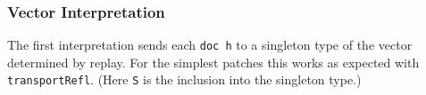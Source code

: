 \subsubsection{Vector Interpretation}

The first interpretation sends each \texttt{doc h} to a singleton type of the vector determined
by replay. For the simplest patches this works as expected with \texttt{transportRefl}.
(Here \texttt{S} is the inclusion into the singleton type.)
\begin{code}%
%
\>[2]\AgdaFunction{\AgdaUnderscore{}}\AgdaSpace{}%
\AgdaSymbol{:}\AgdaSpace{}%
\AgdaSpace{}%
\AgdaSpace{}%
\AgdaSymbol{(}\AgdaSpace{}%
\AgdaInductiveConstructor{[]}\AgdaSymbol{)}\AgdaSpace{}%
\AgdaSpace{}%
\AgdaSpace{}%
\AgdaSymbol{(}\AgdaSpace{}%
\AgdaSpace{}%
\AgdaInductiveConstructor{[]}\AgdaSymbol{)}\<%
\\
%
\>[2]\AgdaSymbol{\AgdaUnderscore{}}\AgdaSpace{}%
\AgdaSymbol{=}\AgdaSpace{}%
\AgdaSpace{}%
\AgdaSymbol{\AgdaUnderscore{}}\<%
\\
%
\\[\AgdaEmptyExtraSkip]%
%
\>[2]\AgdaFunction{\AgdaUnderscore{}}\AgdaSpace{}%
\AgdaSymbol{:}\AgdaSpace{}%
\AgdaSpace{}%
\AgdaSpace{}%
\AgdaSymbol{(}\AgdaSpace{}%
\AgdaSymbol{(}\AgdaSpace{}%
\AgdaSpace{}%
\AgdaInductiveConstructor{[]}\AgdaSymbol{))}\AgdaSpace{}%
\AgdaSpace{}%
\AgdaSpace{}%
\AgdaInductiveConstructor{[]}\<%
\\
%
\>[2]\AgdaSymbol{\AgdaUnderscore{}}\AgdaSpace{}%
\AgdaSymbol{=}\AgdaSpace{}%
\AgdaSpace{}%
\AgdaSymbol{\AgdaUnderscore{}}\<%
\\
%
\\[\AgdaEmptyExtraSkip]%
%
\>[2]\AgdaFunction{\AgdaUnderscore{}}\AgdaSpace{}%
\AgdaSymbol{:}\AgdaSpace{}%
\AgdaSpace{}%
\AgdaSpace{}%
\AgdaSymbol{(}\AgdaSpace{}%
\AgdaSpace{}%
\AgdaSymbol{(}\AgdaSpace{}%
\AgdaInductiveConstructor{[]}\AgdaSymbol{))}\AgdaSpace{}%
\AgdaSpace{}%
\AgdaSpace{}%
\AgdaInductiveConstructor{[]}\<%
\\
%
\>[2]\AgdaSymbol{\AgdaUnderscore{}}\AgdaSpace{}%

\end{code}
